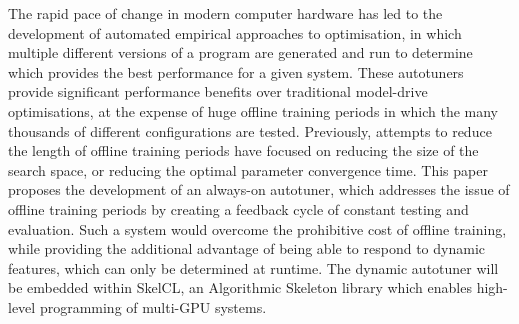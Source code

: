 The rapid pace of change in modern computer hardware has led to the
development of automated empirical approaches to optimisation, in
which multiple different versions of a program are generated and run
to determine which provides the best performance for a given
system. These autotuners provide significant performance benefits over
traditional model-drive optimisations, at the expense of huge offline
training periods in which the many thousands of different
configurations are tested. Previously, attempts to reduce the length
of offline training periods have focused on reducing the size of the
search space, or reducing the optimal parameter convergence time.
This paper proposes the development of an always-on autotuner, which
addresses the issue of offline training periods by creating a feedback
cycle of constant testing and evaluation. Such a system would overcome
the prohibitive cost of offline training, while providing the
additional advantage of being able to respond to dynamic features,
which can only be determined at runtime. The dynamic autotuner will be
embedded within SkelCL, an Algorithmic Skeleton library which enables
high-level programming of multi-GPU systems.

